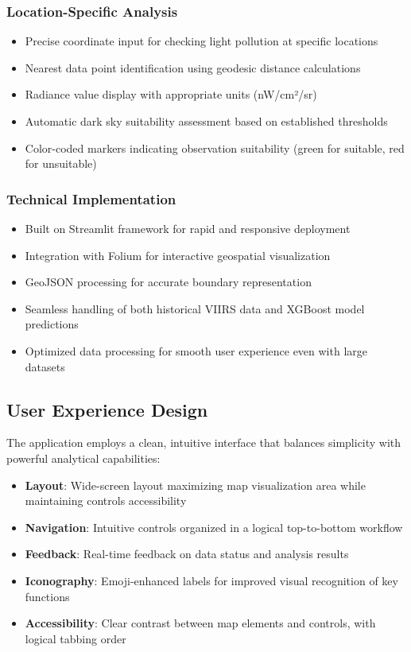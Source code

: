 \documentclass[12pt,a4paper]{article}
\begin{document}
\subsubsection{Location-Specific Analysis}
\begin{itemize}
    \item Precise coordinate input for checking light pollution at specific locations
    \item Nearest data point identification using geodesic distance calculations
    \item Radiance value display with appropriate units (nW/cm²/sr)
    \item Automatic dark sky suitability assessment based on established thresholds
    \item Color-coded markers indicating observation suitability (green for suitable, red for unsuitable)
\end{itemize}

\subsubsection{Technical Implementation}
\begin{itemize}
    \item Built on Streamlit framework for rapid and responsive deployment
    \item Integration with Folium for interactive geospatial visualization
    \item GeoJSON processing for accurate boundary representation
    \item Seamless handling of both historical VIIRS data and XGBoost model predictions
    \item Optimized data processing for smooth user experience even with large datasets
\end{itemize}

\subsection{User Experience Design}

The application employs a clean, intuitive interface that balances simplicity with powerful analytical capabilities:

\begin{itemize}
    \item \textbf{Layout}: Wide-screen layout maximizing map visualization area while maintaining controls accessibility
    \item \textbf{Navigation}: Intuitive controls organized in a logical top-to-bottom workflow
    \item \textbf{Feedback}: Real-time feedback on data status and analysis results
    \item \textbf{Iconography}: Emoji-enhanced labels for improved visual recognition of key functions
    \item \textbf{Accessibility}: Clear contrast between map elements and controls, with logical tabbing order
\end{itemize}
\end{document}
